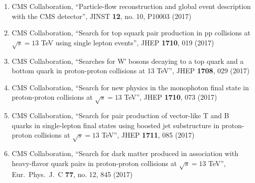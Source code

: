 \begin{enumerate}
\item CMS Collaboration, ``Particle-flow reconstruction and global event description with the CMS detector'', JINST {\bf 12}, no. 10, P10003 (2017)

\item CMS Collaboration, ``Search for top squark pair production in pp collisions at $ \sqrt{s}=13 $ TeV using single lepton events'', JHEP {\bf 1710}, 019 (2017)

\item CMS Collaboration, ``Searches for W′ bosons decaying to a top quark and a bottom quark in proton-proton collisions at 13 TeV'', JHEP {\bf 1708}, 029 (2017)

\item CMS Collaboration, ``Search for new physics in the monophoton final state in proton-proton collisions at $ \sqrt{s}=13 $ TeV'', JHEP {\bf 1710}, 073 (2017)

\item CMS Collaboration, ``Search for pair production of vector-like T and B quarks in single-lepton final states using boosted jet substructure in proton-proton collisions at  $\sqrt{s}=13$ TeV'', JHEP {\bf 1711}, 085 (2017)

\item CMS Collaboration, ``Search for dark matter produced in association with heavy-flavor quark pairs in proton-proton collisions at $\sqrt{s}=13$ TeV'', Eur.\ Phys.\ J.\ C {\bf 77}, no. 12, 845 (2017)


\end{enumerate}
